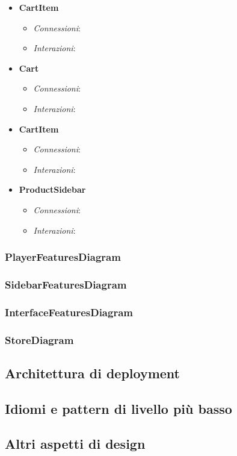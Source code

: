 \begin{itemize}
		\item \textbf{CartItem}
		\begin{itemize}
			\item \textit{Connessioni}:
			\item \textit{Interazioni}:
		\end{itemize} 
		\item \textbf{Cart}
		\begin{itemize}
			\item \textit{Connessioni}:
			\item \textit{Interazioni}:
		\end{itemize} 
		\item \textbf{CartItem}
		\begin{itemize}
			\item \textit{Connessioni}:
			\item \textit{Interazioni}:
		\end{itemize} 
		\item \textbf{ProductSidebar}
		\begin{itemize}
			\item \textit{Connessioni}:
			\item \textit{Interazioni}:
		\end{itemize} 
	\end{itemize}
	


\subsubsection{PlayerFeaturesDiagram}


\subsubsection{SidebarFeaturesDiagram}


\subsubsection{InterfaceFeaturesDiagram}


\subsubsection{StoreDiagram}


\subsection{Architettura di deployment}
\subsection{Idiomi e pattern di livello più basso}
\subsection{Altri aspetti di design}
























